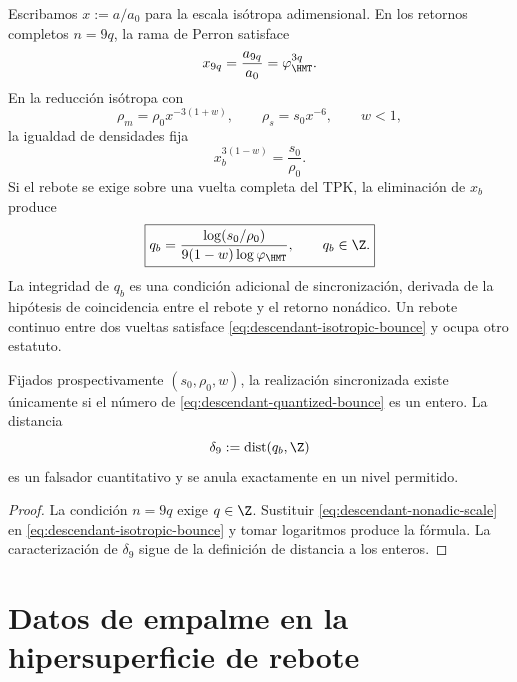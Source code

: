 Escribamos \(x:=a/a_0\) para la escala is\'otropa adimensional. En los
retornos completos \(n=9q\), la rama de Perron satisface
\begin{equation}
 x_{9q}=\frac{a_{9q}}{a_0}=\varphi_{\HMT}^{3q}.
 \label{eq:descendant-nonadic-scale}
\end{equation}
En la reducci\'on is\'otropa con
\begin{equation}
 \rho_m=\rho_0x^{-3(1+w)},
 \qquad
 \rho_s=s_0x^{-6},
 \qquad
 w<1,
 \label{eq:descendant-isotropic-densities}
\end{equation}
la igualdad de densidades fija
\begin{equation}
 x_b^{3(1-w)}=\frac{s_0}{\rho_0}.
 \label{eq:descendant-isotropic-bounce}
\end{equation}
Si el rebote se exige sobre una vuelta completa del TPK, la eliminaci\'on de
\(x_b\) produce
\begin{equation}
 \boxed{
 q_b=
 \frac{\log(s_0/\rho_0)}
 {9(1-w)\log\varphi_{\HMT}},
 \qquad
 q_b\in\Z.}
 \label{eq:descendant-quantized-bounce}
\end{equation}
La integridad de \(q_b\) es una condici\'on adicional de sincronizaci\'on,
derivada de la hip\'otesis de coincidencia entre el rebote y el retorno
non\'adico. Un rebote continuo entre dos vueltas satisface
\cref{eq:descendant-isotropic-bounce} y ocupa otro estatuto.

\begin{proposition}
\label{prop:descendant-quantization-falsifier}
Fijados prospectivamente \((s_0,\rho_0,w)\), la realizaci\'on sincronizada
existe \'unicamente si el n\'umero de
\cref{eq:descendant-quantized-bounce} es un entero. La distancia
\begin{equation}
 \delta_9:=\operatorname{dist}(q_b,\Z)
 \label{eq:descendant-quantization-defect}
\end{equation}
es un falsador cuantitativo y se anula exactamente en un nivel permitido.
\end{proposition}

\begin{proof}
La condici\'on \(n=9q\) exige \(q\in\Z\). Sustituir
\cref{eq:descendant-nonadic-scale} en
\cref{eq:descendant-isotropic-bounce} y tomar logaritmos produce la f\'ormula.
La caracterizaci\'on de \(\delta_9\) sigue de la definici\'on de distancia a
los enteros.
\end{proof}

\section{Datos de empalme en la hipersuperficie de rebote}

